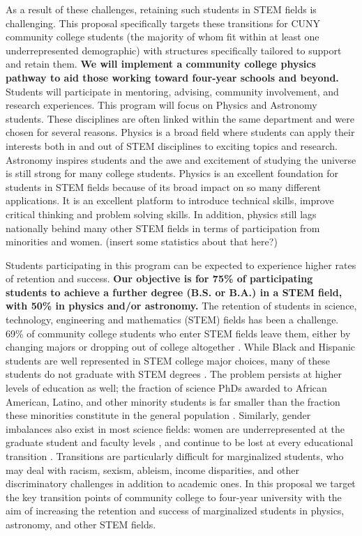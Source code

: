 \documentclass[12pt]{article}
\begin{document}
As a result of these challenges, retaining such students in STEM fields is challenging.
This proposal specifically targets these transitions for CUNY community college students (the majority of whom fit within at least one underrepresented demographic) with structures specifically tailored to support and retain them.
{\bf We will implement a community college physics pathway to aid those working toward four-year schools and beyond.} Students will participate in mentoring, advising, community involvement, and research experiences.  This program will focus on Physics and Astronomy students.  These disciplines are often linked within the same department and were chosen for several reasons.  Physics is a broad field where students can apply their interests both in and out of STEM disciplines to exciting topics and research. Astronomy inspires students and the awe and excitement of studying the universe is still strong for many college students.  Physics is an excellent foundation for students in STEM fields because of its broad impact on so many different applications. It is an excellent platform to introduce technical skills, improve critical thinking and problem solving skills.  In addition, physics still lags nationally behind many other STEM fields in terms of participation from minorities and women.  (insert some statistics about that here?)

Students participating in this program can be expected to experience higher rates of retention and success. %
{\bf Our objective is for  75\% of participating students to achieve a further degree (B.S. or B.A.) in a STEM field, with 50\%  in physics and/or  astronomy.} %
The retention of students in science, technology, engineering and mathematics (STEM) fields has been a challenge.  69\% of community college students who enter STEM fields leave them, either by changing majors or dropping out of college altogether \citep{NCES}.  While Black and Hispanic students are well represented in STEM college major choices, many of these students do not graduate with STEM degrees \citep{Ma15}.  The problem persists at higher levels of education as well; the fraction of science PhDs awarded to African American, Latino, and other minority students is far smaller than the fraction these minorities constitute in the general population \citep{NSF06,Ivie18}.   Similarly, gender imbalances also exist in most science fields: women are underrepresented at the graduate student and faculty levels \citep{NSF04,Ivie18}, and continue to be lost at every educational transition \citep{NAP}. 	Transitions are particularly difficult for marginalized students, who may deal with racism, sexism, ableism, income disparities, and other discriminatory challenges in addition to academic ones.  In this proposal we target the key transition points of community college to four-year university with the aim of increasing the retention and success of marginalized students in physics, astronomy, and other STEM fields.   
\end{document}

